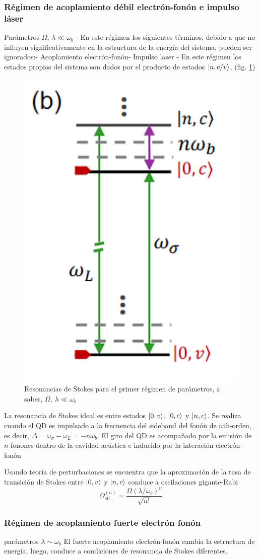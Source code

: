 \documentclass[main.tex]{subfiles}
\begin{document}
\subsubsection{Régimen de acoplamiento débil electrón-fonón e impulso láser}
Parámetros $\Omega,\, \lambda \ll \omega_b$
- En este régimen los siguientes términos, debido a que no influyen significativamente en la estructura de la energía del sistema, pueden ser ignorados:- Acoplamiento electrón-fonón- Impulso laser
- En este régimen los estados propios del sistema son dados por el producto de estados $\ket{n,c/v}$, (fig. \ref{fig:resonancesstokes1})
\begin{figure}[th]
	\centering
	\includegraphics[width=0.25\linewidth]{img/resonancesStokes1}
	\caption{Resonancias de Stokes para el primer régimen de parámetros, a saber,  $\Omega,\, \lambda \ll \omega_b$ \parencite{Bin2020}}
	\label{fig:resonancesstokes1}
\end{figure}

La resonancia de Stokes ideal es entre estados $\ket{0,v}$, $\ket{0,c}$ y $\ket{n,c}$. Se realiza cuando el QD es impulsado a la frecuencia del sideband del fonón de $n$th-orden, es decir, $\Delta = \omega_\sigma - \omega_L = -n\omega_b$. El giro del QD es acompañado por la emisión de $n$ fonones dentro de la cavidad acústica e inducido por la interación electrón-fonón

Usando teoría de perturbaciones se encuentra que la aproximación de la tasa de transición de Stokes entre $\ket{0,v}$ y $\ket{n,c}$ conduce a oscilaciones gigante-Rabi \parencite{Bin2020}
\begin{equation}\label{eq:effRabi1}
	\Omega_\text{eff}^{(n)} = \frac{\Omega(\lambda/\omega_b)^n}{\sqrt{n!}}
\end{equation}

\subsubsection{Régimen de acoplamiento fuerte electrón fonón}
parámetros $\lambda \sim \omega_b$
El fuerte acoplamiento electrón-fonón cambia la estructura de energía, luego, conduce a condiciones de resonancia de Stokes diferentes.
\end{document}
